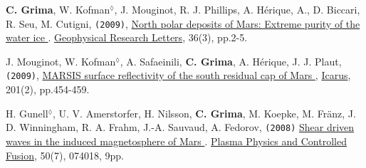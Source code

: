 \begin{etaremune}
\item
  \textbf{C. Grima}, W. Kofman$^\lozenge$, J. Mouginot, R. J. Phillips, A. Hérique, A., D. Biccari, R. Seu, M. Cutigni, \texttt{(2009)}, \href{http://onlinelibrary.wiley.com/doi/10.1029/2008GL036326/abstract}{North polar deposits of Mars: Extreme purity of the water ice \aiOpenAccessSquare}. \ul{Geophysical Research Letters}, 36(3), pp.2-5.
  
\item
  J. Mouginot, W. Kofman$^\lozenge$, A. Safaeinili, \textbf{C. Grima}, A. Hérique, J. J. Plaut, \texttt{(2009)}, \href{http://www.sciencedirect.com/science/article/pii/S0019103509000311}{MARSIS surface reflectivity of the south residual cap of Mars \aiOpenAccessSquare}, \ul{Icarus}, 201(2), pp.454-459.
  
\item
  H. Gunell$^\lozenge$, U. V. Amerstorfer, H. Nilsson, \textbf{C. Grima}, M. Koepke, M. Fränz, J. D. Winningham, R. A. Frahm, J.-A. Sauvaud, A. Fedorov, \texttt{(2008)} \href{http://iopscience.iop.org/0741-3335/50/7/074018}{Shear driven waves in the induced magnetosphere of Mars \aiOpenAccessSquare}. \ul{Plasma Physics and Controlled Fusion}, 50(7), 074018, 9pp.

\end{etaremune}
